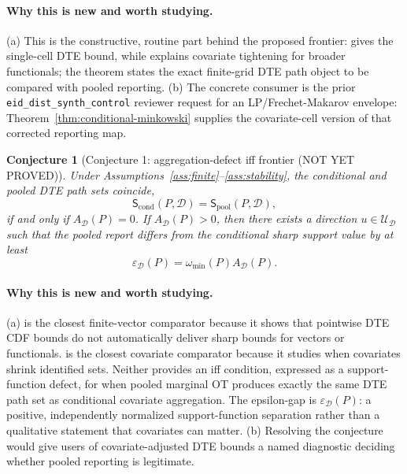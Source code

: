 \documentclass[11pt]{article}
\theoremstyle{definition}
\theoremstyle{plain}
\newtheorem{conjecture}{Conjecture}
\theoremstyle{remark}
\begin{document}
\paragraph{Why this is new and worth studying.}
(a) This is the constructive, routine part behind the proposed frontier: \citet[Section 2]{FanPark2010} gives the single-cell DTE bound, while \citet[abstract and Sections 2--3]{FanGuerreZhu2017} explains covariate tightening for broader functionals; the theorem states the exact finite-grid DTE path object to be compared with pooled reporting.  (b) The concrete consumer is the prior \texttt{eid\_dist\_synth\_control} reviewer request for an LP/Frechet-Makarov envelope: Theorem~\ref{thm:conditional-minkowski} supplies the covariate-cell version of that corrected reporting map.

\begin{conjecture}[Conjecture 1: aggregation-defect iff frontier (NOT YET PROVED)]\label{conj:aggregation-frontier}
Under Assumptions~\ref{ass:finite}--\ref{ass:stability}, the conditional and pooled DTE path sets coincide,
\[
\mathsf S_{\mathrm{cond}}(P,\mathcal D)=\mathsf S_{\mathrm{pool}}(P,\mathcal D),
\]
if and only if \(A_{\mathcal D}(P)=0\).  If \(A_{\mathcal D}(P)>0\), then there exists a direction \(u\in\mathcal U_{\mathcal D}\) such that the pooled report differs from the conditional sharp support value by at least
\[
\varepsilon_{\mathcal D}(P)=\omega_{\min}(P)A_{\mathcal D}(P).
\]
\end{conjecture}
\paragraph{Why this is new and worth studying.}
(a) \citet[Section 2]{FirpoRidder2019} is the closest finite-vector comparator because it shows that pointwise DTE CDF bounds do not automatically deliver sharp bounds for vectors or functionals.  \citet[abstract and Sections 2--3]{FanGuerreZhu2017} is the closest covariate comparator because it studies when covariates shrink identified sets.  Neither provides an iff condition, expressed as a support-function defect, for when pooled marginal OT produces exactly the same DTE path set as conditional covariate aggregation.  The epsilon-gap is \(\varepsilon_{\mathcal D}(P)\): a positive, independently normalized support-function separation rather than a qualitative statement that covariates can matter.  (b) Resolving the conjecture would give users of \citet{FanPark2010} covariate-adjusted DTE bounds a named diagnostic deciding whether pooled reporting is legitimate.
\end{document}
